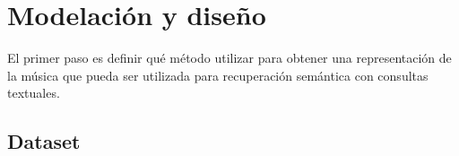 \section{Modelación y diseño}
\label{sec:design}
El primer paso es definir qué método utilizar para obtener una representación de la música que pueda ser utilizada para recuperación semántica con consultas textuales.
\subsection{Dataset}
\label{subsec:dataset}





